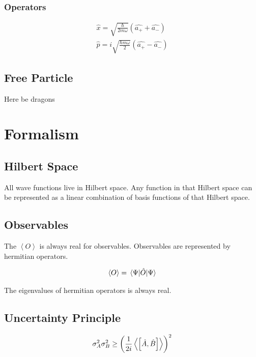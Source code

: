 \documentclass[10pt]{amsart}
\begin{document}
\begin{multicols}{2}
\subsubsection{Operators}%
\label{ssub:operators}

\begin{align*}
  \hat{x}=\sqrt{\frac{\hbar}{2m\omega}}\left(\hat{a_{+}}+\hat{a_{-}}\right)\\
  \hat{p}=i\sqrt{\frac{\hbar m \omega}{2}}\left(\hat{a_{+}}-\hat{a_{-}}\right)
\end{align*}

\subsection{Free Particle}%
\label{sub:free_particle}

Here be dragons

\section{Formalism}%
\label{sec:formalism}

\subsection{Hilbert Space}%
\label{sub:hilbert_space}

All wave functions live in Hilbert space. Any function in that Hilbert space
can be represented as a linear combination of basis functions of that Hilbert
space.

\subsection{Observables}%
\label{sub:observables}

The $\left<O\right>$ is always real for observables. Observables are
represented by hermitian operators.

\begin{align*}
  \left<O\right>=\expval{\hat{O}}{\Psi}
\end{align*}

The eigenvalues of hermitian operators is always real.

\subsection{Uncertainty Principle}%
\label{sub:uncertainty_principle}

\begin{align*}
  \sigma_A^2\sigma_B^2\geq {\left(\frac{1}{2i}\expval{\left[\hat{A},\hat{B}\right]}\right)}^2
\end{align*}


\end{multicols}
\end{document}
